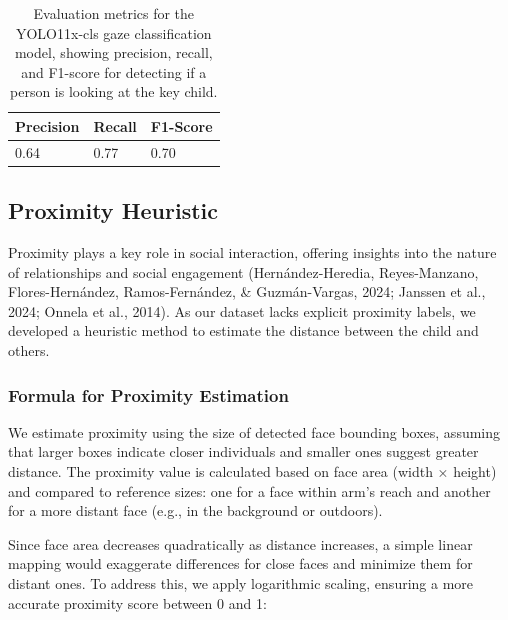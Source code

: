 \documentclass[
  man,floatsintext]{apa6}
\begin{document}
\begin{table}[tbp]

\begin{center}
\begin{threeparttable}

\caption{\label{tab:gaze-metrics-short}Evaluation metrics for the YOLO11x-cls gaze classification model, showing precision, recall, and F1-score for detecting if a person is looking at the key child.}

\begin{tabular}{lll}
\toprule
Precision & \multicolumn{1}{c}{Recall} & \multicolumn{1}{c}{F1-Score}\\
\midrule
0.64 & 0.77 & 0.70\\
\bottomrule
\end{tabular}

\end{threeparttable}
\end{center}

\end{table}

\subsection{Proximity Heuristic}\label{proximity-heuristic}

Proximity plays a key role in social interaction, offering insights into the nature of relationships and social engagement (Hernández-Heredia, Reyes-Manzano, Flores-Hernández, Ramos-Fernández, \& Guzmán-Vargas, 2024; Janssen et al., 2024; Onnela et al., 2014). As our dataset lacks explicit proximity labels, we developed a heuristic method to estimate the distance between the child and others.

\subsubsection{Formula for Proximity Estimation}\label{formula-for-proximity-estimation}

We estimate proximity using the size of detected face bounding boxes, assuming that larger boxes indicate closer individuals and smaller ones suggest greater distance. The proximity value is calculated based on face area (width × height) and compared to reference sizes: one for a face within arm's reach and another for a more distant face (e.g., in the background or outdoors).

Since face area decreases quadratically as distance increases, a simple linear mapping would exaggerate differences for close faces and minimize them for distant ones. To address this, we apply logarithmic scaling, ensuring a more accurate proximity score between 0 and 1:
\end{document}
